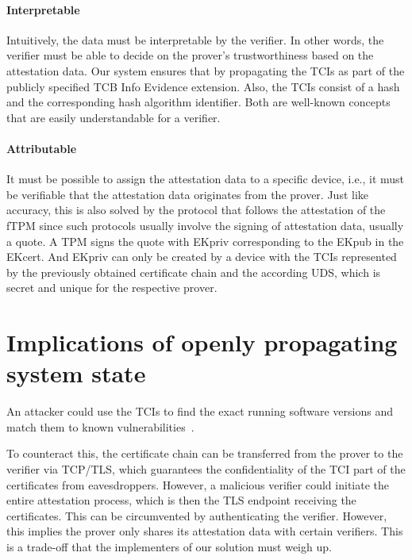 \paragraph{Interpretable}
Intuitively, the data must be interpretable by the verifier.
In other words, the verifier must be able to decide on the prover's trustworthiness based on the attestation data.
Our system ensures that by propagating the TCIs as part of the publicly specified TCB Info Evidence extension.
Also, the TCIs consist of a hash and the corresponding hash algorithm identifier.
Both are well-known concepts that are easily understandable for a verifier.

\paragraph{Attributable}
It must be possible to assign the attestation data to a specific device, i.e., it must be verifiable that the attestation data originates from the prover.
Just like accuracy, this is also solved by the protocol that follows the attestation of the fTPM since such protocols usually involve the signing of attestation data, usually a quote.
A \ac{TPM} signs the quote with EKpriv corresponding to the EKpub in the EKcert.
And EKpriv can only be created by a device with the \acp{TCI} represented by the previously obtained certificate chain and the according \ac{UDS}, which is secret and unique for the respective prover.



\section{Implications of openly propagating system state}

An attacker could use the TCIs to find the exact running software versions and match them to known vulnerabilities~\cite{rfc9334}.

To counteract this, the certificate chain can be transferred from the prover to the verifier via TCP/TLS, which guarantees the confidentiality of the TCI part of the certificates from eavesdroppers.
However, a malicious verifier could initiate the entire attestation process, which is then the TLS endpoint receiving the certificates.
This can be circumvented by authenticating the verifier.
However, this implies the prover only shares its attestation data with certain verifiers.
This is a trade-off that the implementers of our solution must weigh up.


